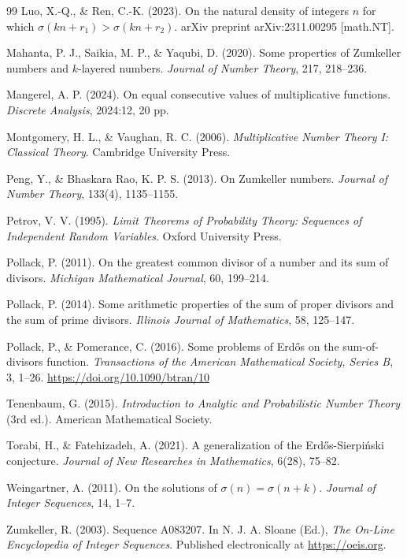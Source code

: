 \documentclass[12pt, a4paper]{article}
\theoremstyle{plain}
\theoremstyle{definition}
\begin{document}
\begin{thebibliography}{99}
Luo, X.-Q., \& Ren, C.-K. (2023). On the natural density of integers $n$ for which $\sigma(kn+r_1) > \sigma(kn+r_2)$. arXiv preprint arXiv:2311.00295 [math.NT].

Mahanta, P. J., Saikia, M. P., \& Yaqubi, D. (2020). Some properties of Zumkeller numbers and $k$-layered numbers. \textit{Journal of Number Theory}, 217, 218--236.

Mangerel, A. P. (2024). On equal consecutive values of multiplicative functions. \textit{Discrete Analysis}, 2024:12, 20 pp.

Montgomery, H. L., \& Vaughan, R. C. (2006). \textit{Multiplicative Number Theory I: Classical Theory}. Cambridge University Press.

Peng, Y., \& Bhaskara Rao, K. P. S. (2013). On Zumkeller numbers. \textit{Journal of Number Theory}, 133(4), 1135--1155.

Petrov, V. V. (1995). \textit{Limit Theorems of Probability Theory: Sequences of Independent Random Variables}. Oxford University Press.

Pollack, P. (2011). On the greatest common divisor of a number and its sum of divisors. \textit{Michigan Mathematical Journal}, 60, 199--214.

Pollack, P. (2014). Some arithmetic properties of the sum of proper divisors and the sum of prime divisors. \textit{Illinois Journal of Mathematics}, 58, 125--147.

Pollack, P., \& Pomerance, C. (2016). Some problems of Erdős on the sum-of-divisors function. \textit{Transactions of the American Mathematical Society, Series B}, 3, 1--26. \url{https://doi.org/10.1090/btran/10}

Tenenbaum, G. (2015). \textit{Introduction to Analytic and Probabilistic Number Theory} (3rd ed.). American Mathematical Society.

Torabi, H., \& Fatehizadeh, A. (2021). A generalization of the Erdős-Sierpiński conjecture. \textit{Journal of New Researches in Mathematics}, 6(28), 75--82.

Weingartner, A. (2011). On the solutions of $\sigma(n)=\sigma(n+k)$. \textit{Journal of Integer Sequences}, 14, 1--7.

Zumkeller, R. (2003). Sequence A083207. In N. J. A. Sloane (Ed.), \textit{The On-Line Encyclopedia of Integer Sequences}. Published electronically at \url{https://oeis.org}.

\end{thebibliography}
\end{document}

